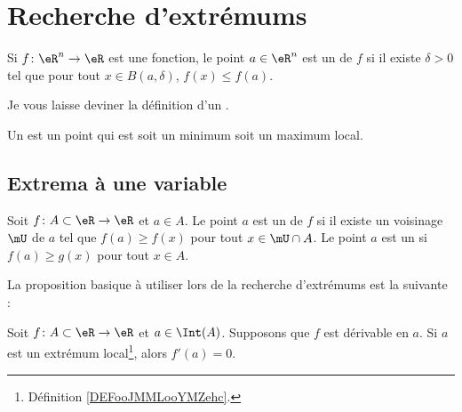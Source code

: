 \section{Recherche d'extrémums}

\begin{definition}      \label{DEFooJMMLooYMZehc}
	Si \( f\colon \eR^n\to \eR\) est une fonction, le point \( a\in \eR^n\) est un  de \( f\) si il existe \( \delta>0\) tel que pour tout \( x\in B(a,\delta)\), \( f(x)\leq f(a)\).

	Je vous laisse deviner la définition d'un .

	Un  est un point qui est soit un minimum soit un maximum local.
\end{definition}

\subsection{Extrema à une variable}

\begin{definition}
	Soit \( f\colon A\subset \eR\to \eR\) et \( a\in A\). Le point \( a\) est un  de \( f\) si il existe un voisinage \( \mU\) de \( a\) tel que \( f(a)\geq f(x)\) pour tout \( x\in\mU\cap A\). Le point \( a\) est un  si \( f(a)\geq g(x)\) pour tout \( x\in A\).
\end{definition}

La proposition basique à utiliser lors de la recherche d'extrémums est la suivante :
\begin{proposition}     \label{PROPooNVKXooXtKkuz}
	Soit \( f\colon A\subset\eR\to \eR\) et \( a\in\Int(A)\). Supposons que \( f\) est dérivable en \( a\). Si \( a\) est un extrémum local\footnote{Définition \ref{DEFooJMMLooYMZehc}.}, alors \( f'(a)=0\).
\end{proposition}

